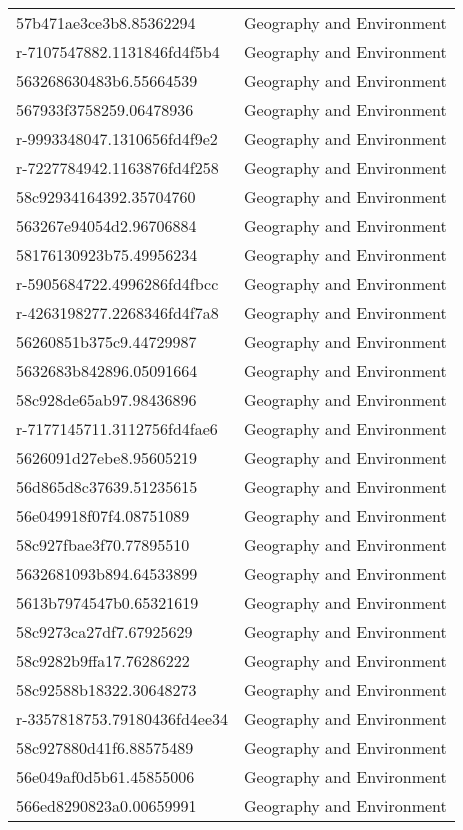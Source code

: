\begin{tabular}{ll}
57b471ae3ce3b8.85362294 & Geography and Environment \\
r-7107547882.1131846fd4f5b4 & Geography and Environment \\
563268630483b6.55664539 & Geography and Environment \\
567933f3758259.06478936 & Geography and Environment \\
r-9993348047.1310656fd4f9e2 & Geography and Environment \\
r-7227784942.1163876fd4f258 & Geography and Environment \\
58c92934164392.35704760 & Geography and Environment \\
563267e94054d2.96706884 & Geography and Environment \\
58176130923b75.49956234 & Geography and Environment \\
r-5905684722.4996286fd4fbcc & Geography and Environment \\
r-4263198277.2268346fd4f7a8 & Geography and Environment \\
56260851b375c9.44729987 & Geography and Environment \\
5632683b842896.05091664 & Geography and Environment \\
58c928de65ab97.98436896 & Geography and Environment \\
r-7177145711.3112756fd4fae6 & Geography and Environment \\
5626091d27ebe8.95605219 & Geography and Environment \\
56d865d8c37639.51235615 & Geography and Environment \\
56e049918f07f4.08751089 & Geography and Environment \\
58c927fbae3f70.77895510 & Geography and Environment \\
5632681093b894.64533899 & Geography and Environment \\
5613b7974547b0.65321619 & Geography and Environment \\
58c9273ca27df7.67925629 & Geography and Environment \\
58c9282b9ffa17.76286222 & Geography and Environment \\
58c92588b18322.30648273 & Geography and Environment \\
r-3357818753.79180436fd4ee34 & Geography and Environment \\
58c927880d41f6.88575489 & Geography and Environment \\
56e049af0d5b61.45855006 & Geography and Environment \\
566ed8290823a0.00659991 & Geography and Environment \\

\end{tabular}
